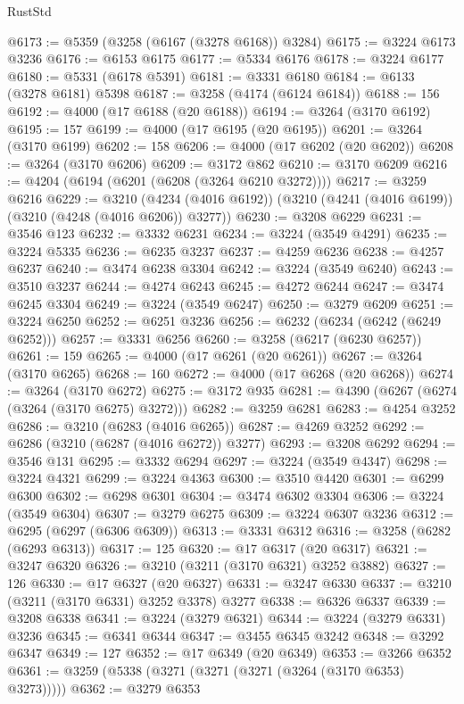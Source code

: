 \begin{lexlean}{RustStd}
\begin{coremodule}
@6173 := @5359 (@3258 (@6167 (@3278 @6168)) @3284)
@6175 := @3224 @6173 @3236
@6176 := @6153 @6175
@6177 := @5334 @6176
@6178 := @3224 @6177
@6180 := @5331 (@6178 @5391)
@6181 := @3331 @6180
@6184 := @6133 (@3278 @6181) @5398
@6187 := @3258 (@4174 (@6124 @6184))
@6188 := 156
@6192 := @4000 (@17 @6188 (@20 @6188))
@6194 := @3264 (@3170 @6192)
@6195 := 157
@6199 := @4000 (@17 @6195 (@20 @6195))
@6201 := @3264 (@3170 @6199)
@6202 := 158
@6206 := @4000 (@17 @6202 (@20 @6202))
@6208 := @3264 (@3170 @6206)
@6209 := @3172 @862
@6210 := @3170 @6209
@6216 := @4204 (@6194 (@6201 (@6208 (@3264 @6210 @3272))))
@6217 := @3259 @6216
@6229 := @3210
    (@4234 (@4016 @6192))
    (@3210 (@4241 (@4016 @6199)) (@3210 (@4248 (@4016 @6206)) @3277))
@6230 := @3208 @6229
@6231 := @3546 @123
@6232 := @3332 @6231
@6234 := @3224 (@3549 @4291)
@6235 := @3224 @5335
@6236 := @6235 @3237
@6237 := @4259 @6236
@6238 := @4257 @6237
@6240 := @3474 @6238 @3304
@6242 := @3224 (@3549 @6240)
@6243 := @3510 @3237
@6244 := @4274 @6243
@6245 := @4272 @6244
@6247 := @3474 @6245 @3304
@6249 := @3224 (@3549 @6247)
@6250 := @3279 @6209
@6251 := @3224 @6250
@6252 := @6251 @3236
@6256 := @6232 (@6234 (@6242 (@6249 @6252)))
@6257 := @3331 @6256
@6260 := @3258 (@6217 (@6230 @6257))
@6261 := 159
@6265 := @4000 (@17 @6261 (@20 @6261))
@6267 := @3264 (@3170 @6265)
@6268 := 160
@6272 := @4000 (@17 @6268 (@20 @6268))
@6274 := @3264 (@3170 @6272)
@6275 := @3172 @935
@6281 := @4390 (@6267 (@6274 (@3264 (@3170 @6275) @3272)))
@6282 := @3259 @6281
@6283 := @4254 @3252
@6286 := @3210 (@6283 (@4016 @6265))
@6287 := @4269 @3252
@6292 := @6286 (@3210 (@6287 (@4016 @6272)) @3277)
@6293 := @3208 @6292
@6294 := @3546 @131
@6295 := @3332 @6294
@6297 := @3224 (@3549 @4347)
@6298 := @3224 @4321
@6299 := @3224 @4363
@6300 := @3510 @4420
@6301 := @6299 @6300
@6302 := @6298 @6301
@6304 := @3474 @6302 @3304
@6306 := @3224 (@3549 @6304)
@6307 := @3279 @6275
@6309 := @3224 @6307 @3236
@6312 := @6295 (@6297 (@6306 @6309))
@6313 := @3331 @6312
@6316 := @3258 (@6282 (@6293 @6313))
@6317 := 125
@6320 := @17 @6317 (@20 @6317)
@6321 := @3247 @6320
@6326 := @3210 (@3211 (@3170 @6321) @3252 @3882)
@6327 := 126
@6330 := @17 @6327 (@20 @6327)
@6331 := @3247 @6330
@6337 := @3210 (@3211 (@3170 @6331) @3252 @3378) @3277
@6338 := @6326 @6337
@6339 := @3208 @6338
@6341 := @3224 (@3279 @6321)
@6344 := @3224 (@3279 @6331) @3236
@6345 := @6341 @6344
@6347 := @3455 @6345 @3242
@6348 := @3292 @6347
@6349 := 127
@6352 := @17 @6349 (@20 @6349)
@6353 := @3266 @6352
@6361 := @3259 (@5338 (@3271 (@3271 (@3271 (@3264 (@3170 @6353) @3273)))))
@6362 := @3279 @6353

\end{coremodule}
\end{lexlean}
